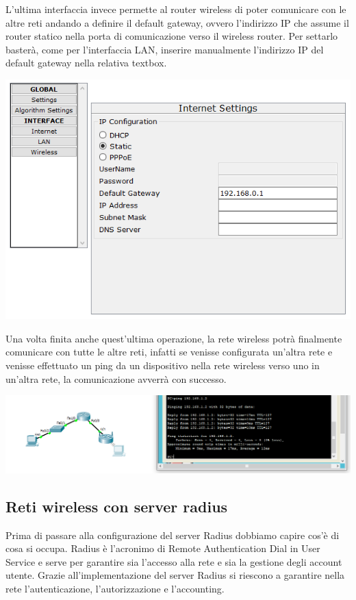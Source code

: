 L’ultima interfaccia invece permette al router wireless di poter comunicare con le altre reti andando a definire il default gateway, ovvero l’indirizzo IP che assume il router statico nella porta di comunicazione verso il wireless router. Per settarlo basterà, come per l’interfaccia LAN, inserire manualmente l’indirizzo IP del default gateway nella relativa textbox.

\begin{center}
    \includegraphics[width=\linewidth]{images/08.wireless/16.png}
\end{center}

Una volta finita anche quest’ultima operazione, la rete wireless potrà finalmente comunicare con tutte le altre reti, infatti se venisse configurata un'altra rete e venisse effettuato un ping da un dispositivo nella rete wireless verso uno in un'altra rete, la comunicazione avverrà con successo.

\begin{center}
    \includegraphics[width=\linewidth]{images/08.wireless/17.png}
\end{center}

\subsection{Reti wireless con server radius}
Prima di passare alla configurazione del server Radius dobbiamo capire cos’è di cosa si occupa.
Radius è l’acronimo di Remote Authentication Dial in User Service e serve per garantire sia l’accesso alla rete e sia la gestione degli account utente. Grazie all’implementazione del server Radius si riescono a garantire nella rete l’autenticazione, l’autorizzazione e l’accounting. 


